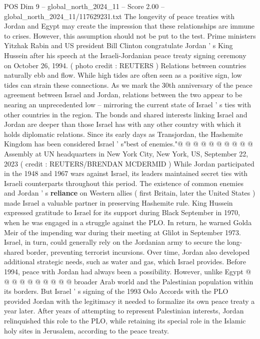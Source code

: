 \begin{textsample}{POS Dim 9 – global\_north\_2024\_11 – Score 2.00 – global\_north\_2024\_11/117629231.txt}  \label{ex:f9_pos_237}
The longevity of peace treaties with Jordan and Egypt may create the impression that these relationships are immune to crises.
However, this assumption should not be put to the test.
Prime ministers Yitzhak Rabin and US president Bill Clinton congratulate Jordan ' s King Hussein after his speech at the Israeli-Jordanian peace treaty signing ceremony on October 26, 1994. ( photo credit : REUTERS ) Relations between countries naturally ebb and flow.
While high tides are often seen as a positive sign, low tides can strain these connections.
As we mark the 30th anniversary of the peace agreement between Israel and Jordan, relations between the two appear to be nearing an unprecedented low -- mirroring the current state of Israel ' s ties with other countries in the region.
The bonds and shared interests linking Israel and Jordan are deeper than those Israel has with any other country with which it holds diplomatic relations.
Since its early days as Transjordan, the Hashemite Kingdom has been considered Israel ' s"best of enemies."@ @ @ @ @ @ @ @ @ @ Assembly at UN headquarters in New York City, New York, US, September 22, 2023 ( credit : REUTERS/BRENDAN MCDERMID ) While Jordan participated in the 1948 and 1967 wars against Israel, its leaders maintained secret ties with Israeli counterparts throughout this period.
The existence of common enemies and Jordan ' s \textbf{reliance} on Western allies ( first Britain, later the United States ) made Israel a valuable partner in preserving Hashemite rule.
King Hussein expressed gratitude to Israel for its support during Black September in 1970, when he was engaged in a struggle against the PLO.
In return, he warned Golda Meir of the impending war during their meeting at Glilot in September 1973.
Israel, in turn, could generally rely on the Jordanian army to secure the long-shared border, preventing terrorist incursions.
Over time, Jordan also developed additional strategic needs, such as water and gas, which Israel provides.
Before 1994, peace with Jordan had always been a possibility.
However, unlike Egypt @ @ @ @ @ @ @ @ @ @ broader Arab world and the Palestinian population within its borders.
But Israel ' s signing of the 1993 Oslo Accords with the PLO provided Jordan with the legitimacy it needed to formalize its own peace treaty a year later.
After years of attempting to represent Palestinian interests, Jordan relinquished this role to the PLO, while retaining its special role in the Islamic holy sites in Jerusalem, according to the peace treaty.

\end{textsample}
